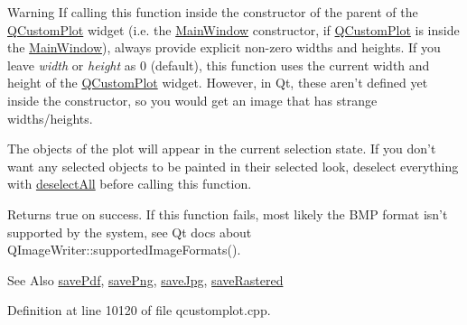 \begin{DoxyWarning}{Warning}
If calling this function inside the constructor of the parent of the \hyperlink{class_q_custom_plot}{Q\-Custom\-Plot} widget (i.\-e. the \hyperlink{class_main_window}{Main\-Window} constructor, if \hyperlink{class_q_custom_plot}{Q\-Custom\-Plot} is inside the \hyperlink{class_main_window}{Main\-Window}), always provide explicit non-\/zero widths and heights. If you leave {\itshape width} or {\itshape height} as 0 (default), this function uses the current width and height of the \hyperlink{class_q_custom_plot}{Q\-Custom\-Plot} widget. However, in Qt, these aren't defined yet inside the constructor, so you would get an image that has strange widths/heights.
\end{DoxyWarning}
The objects of the plot will appear in the current selection state. If you don't want any selected objects to be painted in their selected look, deselect everything with \hyperlink{class_q_custom_plot_a9d4808ab925b003054085246c92a257c}{deselect\-All} before calling this function.

Returns true on success. If this function fails, most likely the B\-M\-P format isn't supported by the system, see Qt docs about Q\-Image\-Writer\-::supported\-Image\-Formats().

\begin{DoxySeeAlso}{See Also}
\hyperlink{class_q_custom_plot_a84e33ad7492180f20ff520e557ed102d}{save\-Pdf}, \hyperlink{class_q_custom_plot_a7636261aff1f6d25c9da749ece3fc8b8}{save\-Png}, \hyperlink{class_q_custom_plot_a490c722092d1771e8ce4a7a73dfd84ab}{save\-Jpg}, \hyperlink{class_q_custom_plot_ab528b84cf92baabe29b1d0ef2f77c93e}{save\-Rastered} 
\end{DoxySeeAlso}


Definition at line 10120 of file qcustomplot.\-cpp.

